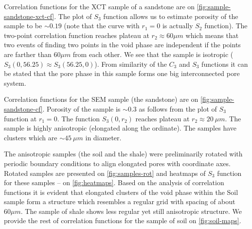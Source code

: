 \documentclass[reprint,amsmath,amssymb,aps,pre,showkeys,showpacs]{revtex4-1}
\begin{document}
Correlation functions for the XCT sample of a sandstone are on
\cref{fig:sample-sandstone-xct-cf}. The plot of $S_3$ function allows us to
estimate porosity of the sample to be $\sim 0.19$ (note that the curve with
$r_1 = 0$ is actually $S_2$ function). The two-point correlation function
reaches plateau at $r_2 \approx 60 \mu m$ which means that two events
of finding two points in the void phase are independent if the points are
farther than $60 \mu m$ from each other. We see that the sample is isotropic
($S_3(0, 56.25) \approx S_3(56.25, 0)$). From similarity of the $C_3$ and $S_3$
functions it can be stated that the pore phase in this sample forms one big
interconnected pore system.

Correlation functions for the SEM sample (the sandstone) are on
\cref{fig:sample-sandstone-cf}. Porosity of the sample is $\sim 0.3$ as follows
from the plot of $S_3$ function at $r_1 = 0$. The function $S_3(0, r_2)$ reaches
plateau at $r_2 \approx 20\ \mu m$. The sample is highly anisotropic (elongated
along the ordinate). The samples have clusters which are $\sim 45\ \mu m$ in
diameter.

The anisotropic samples (the soil and the shale) were preliminarily rotated with
periodic boundary conditions to align elongated pores with coordinate
axes. Rotated samples are presented on \cref{fig:samples-rot} and heatmaps of
$S_3$ function for these samples -- on \cref{fig:heatmaps}. Based on the
analysis of correlation functions it is evident that elongated clusters of the
void phase within the Soil sample form a structure which resembles a regular
grid with spacing of about $60 \mu m$. The sample of shale shows less regular
yet still anisotropic structure. We provide the rest of correlation functions
for the sample of soil on \cref{fig:soil-maps}.
\end{document}
